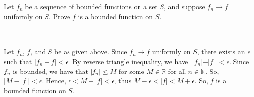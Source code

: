 Let $f_n$ be a sequence of bounded functions on a set $S$, and suppose $f_n\rightarrow f$ uniformly on
$S$. Prove $f$ is a bounded function on $S$.\\\\

\begin{solution}\renewcommand{\qedsymbol}{}\ \\
    Let $f_n$, $f$, and $S$ be as given above. Since $f_n\rightarrow f$ uniformly on $S$, there exists
    an $\epsilon$ such that $|f_n-f|<\epsilon$. By reverse triangle inequality, we have
    $||f_n|-|f||<\epsilon$. Since $f_n$ is bounded, we have that $|f_n|\leq M$ for some $M\in\mathbb{R}$
    for all $n\in\mathbb{N}$. So, $|M-|f||<\epsilon$. Hence, $\epsilon<M-|f|<\epsilon$, thus
    $M-\epsilon<|f|<M+\epsilon$. So, $f$ is a bounded function on $S$.

\end{solution}